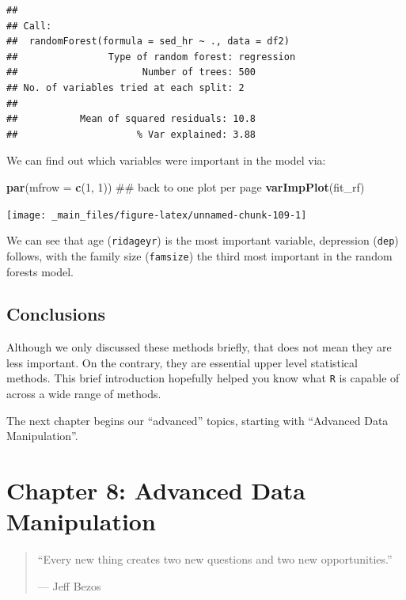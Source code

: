 \documentclass[]{tufte-book}
\newenvironment{Shaded}{}{}
\newcommand{\KeywordTok}[1]{\textcolor[rgb]{0.00,0.44,0.13}{\textbf{#1}}}
\newcommand{\DataTypeTok}[1]{\textcolor[rgb]{0.56,0.13,0.00}{#1}}
\newcommand{\DecValTok}[1]{\textcolor[rgb]{0.25,0.63,0.44}{#1}}
\newcommand{\NormalTok}[1]{#1}
\theoremstyle{definition}
\theoremstyle{definition}
\theoremstyle{remark}
\begin{document}
\begin{verbatim}
## 
## Call:
##  randomForest(formula = sed_hr ~ ., data = df2) 
##                Type of random forest: regression
##                      Number of trees: 500
## No. of variables tried at each split: 2
## 
##           Mean of squared residuals: 10.8
##                     % Var explained: 3.88
\end{verbatim}

We can find out which variables were important in the model via:

\begin{Shaded}
\begin{Highlighting}[]
\KeywordTok{par}\NormalTok{(}\DataTypeTok{mfrow =} \KeywordTok{c}\NormalTok{(}\DecValTok{1}\NormalTok{, }\DecValTok{1}\NormalTok{))  ## back to one plot per page}
\KeywordTok{varImpPlot}\NormalTok{(fit_rf)}
\end{Highlighting}
\end{Shaded}

\texttt{[image: \_main\_files/figure-latex/unnamed-chunk-109-1]}

We can see that age (\texttt{ridageyr}) is the most important variable,
depression (\texttt{dep}) follows, with the family size
(\texttt{famsize}) the third most important in the random forests model.

\section*{Conclusions}\label{conclusions-3}

Although we only discussed these methods briefly, that does not mean
they are less important. On the contrary, they are essential upper level
statistical methods. This brief introduction hopefully helped you know
what \texttt{R} is capable of across a wide range of methods.

The next chapter begins our ``advanced'' topics, starting with
``Advanced Data Manipulation''.

\chapter*{Chapter 8: Advanced Data
Manipulation}\label{chapter-8-advanced-data-manipulation}

\begin{quote}
``Every new thing creates two new questions and two new opportunities.''

--- Jeff Bezos
\end{quote}
\end{document}
